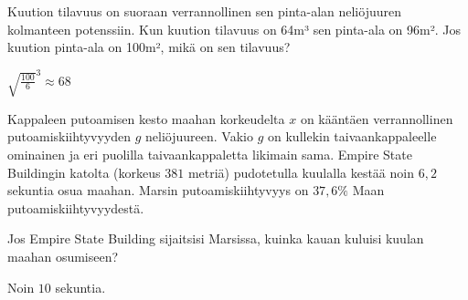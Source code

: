 \begin{tehtavasivu}
\begin{tehtava}
\begin{alakohdat}
\end{alakohdat} 
\begin{vastaus}
\begin{alakohdat}
\end{alakohdat} 
\end{vastaus}
\end{tehtava}

\begin{tehtava}
	Kuution tilavuus on suoraan verrannollinen sen pinta-alan neliöjuuren kolmanteen potenssiin. Kun kuution tilavuus on 64m³ sen pinta-ala on 96m². Jos kuution pinta-ala on 100m², mikä on sen tilavuus?
	\begin{vastaus}
		${\sqrt{\frac{100}{6}}}^{3} \approx 68$
	\end{vastaus}
\end{tehtava}

\begin{tehtava}
Kappaleen putoamisen kesto maahan korkeudelta $x$ on kääntäen verrannollinen putoamiskiihtyvyyden $g$ neliöjuureen. Vakio $g$ on kullekin taivaankappaleelle ominainen ja eri puolilla taivaankappaletta likimain sama. Empire State Buildingin katolta (korkeus $381$ metriä) pudotetulla kuulalla kestää noin $6,2$ sekuntia osua maahan. Marsin putoamiskiihtyvyys on $37,6\%$ Maan putoamiskiihtyvyydestä. 

Jos Empire State Building sijaitsisi Marsissa, kuinka kauan kuluisi kuulan maahan osumiseen?
    \begin{vastaus}
        Noin $10$ sekuntia.
    \end{vastaus}
\end{tehtava}

\end{tehtavasivu}
